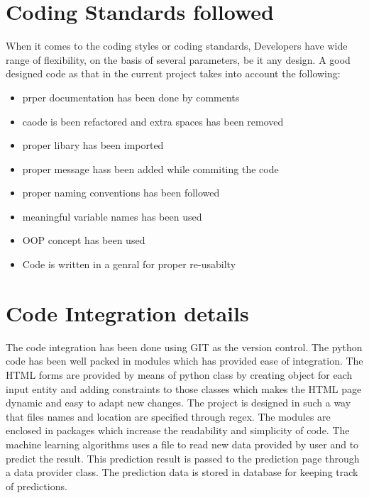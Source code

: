 \documentclass[oneside,12pt]{Classes/VTU}
\begin{document}
	\section{Coding Standards followed}
	When it comes to the coding styles or coding standards, Developers have wide range of flexibility, on the basis of several parameters, be it any design. A good designed code as that in the current project takes into account the following:
	\begin{itemize}
		\item prper documentation has been done by comments
		\item caode is been refactored and extra spaces has been removed 
		\item proper libary has been imported
		\item proper message hass been added while commiting the code 
		\item proper naming conventions has been followed
		\item meaningful variable names has been used
		\item OOP concept has been used 
		\item Code is written in a genral for proper re-usabilty 
	\end{itemize}
	
	\section{Code Integration details}
	The code integration has been done using GIT as the version control. The python code has been well packed in modules which has provided ease of integration. The HTML forms are provided by means of python class by creating object for each input entity and adding constraints to those classes which makes the HTML page dynamic and easy to adapt new changes. The project is designed in such a way that files names and location are specified through regex. The modules are enclosed in packages which increase the readability and simplicity of code. The machine learning algorithms uses a file to read new data provided by user and to predict the result. This prediction result is passed to the prediction page through a data provider class. The prediction data is stored in database for keeping track of predictions.
	
\end{document}
